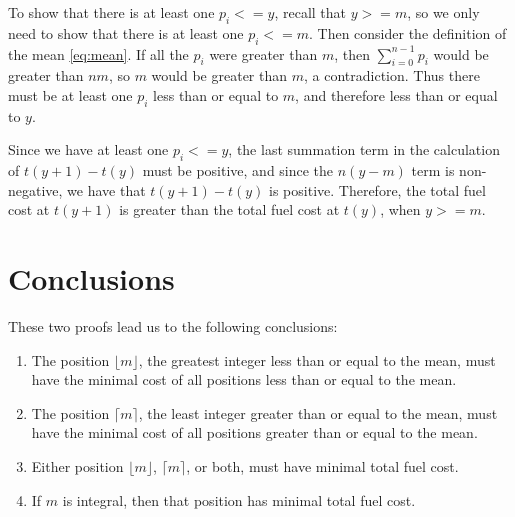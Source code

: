 \documentclass{article}
\begin{document}
To show that there is at least one $p_i <= y$, recall that $y >= m$,
so we only need to show that there is at least one $p_i <= m$.
Then consider the definition of the mean \eqref{eq:mean}. If all
the $p_i$ were greater than $m$, then $\sum_{i=0}^{n-1} p_i$ would be
greater than $nm$, so $m$ would be greater than $m$, a contradiction.
Thus there must be at least one $p_i$ less than or equal to $m$,
and therefore less than or equal to $y$.

Since we have at least one $p_i <= y$, the last summation term
in the calculation of $t(y+1) - t(y)$ must be positive, and since
the $n(y-m)$ term is non-negative, we have that $t(y+1) - t(y)$ is
positive. Therefore, the total fuel cost at $t(y+1)$ is greater than
the total fuel cost at $t(y)$, when $y >= m$.

\section{Conclusions}

These two proofs lead us to the following conclusions:
\begin{enumerate}
  \item The position $\lfloor m \rfloor$, the greatest integer less
        than or equal to the mean, must have the minimal cost of all
        positions less than or equal to the mean.
  \item The position $\lceil m \rceil$, the least integer greater than
        or equal to the mean, must have the minimal cost of all positions
        greater than or equal to the mean.
  \item Either position $\lfloor m \rfloor$, $\lceil m \rceil$, or
        both, must have minimal total fuel cost.
  \item If $m$ is integral, then that position has minimal total fuel
        cost.
\end{enumerate}
\end{document}

